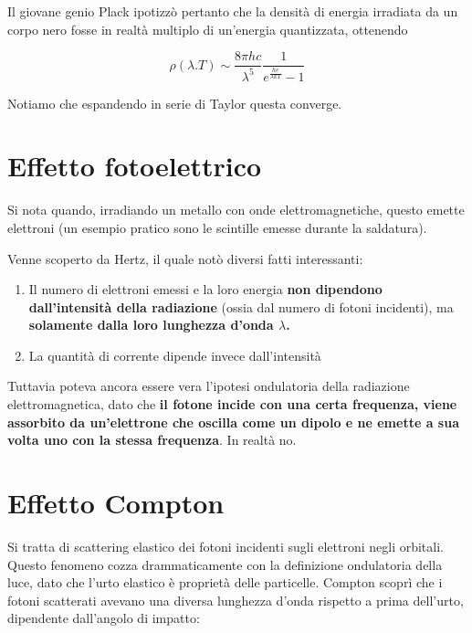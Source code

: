 Il giovane genio Plack ipotizz\`o pertanto che la densit\`a di energia irradiata da un corpo nero fosse in realt\`a multiplo di un'energia quantizzata, ottenendo

\begin{equation}
\rho(\lambda. T) \sim \frac{8\pi h c}{\lambda^5} \frac{1}{e^{\frac{hc}{\lambda k T}} -1}
\end{equation}

Notiamo che espandendo in serie di Taylor questa converge.\\




\section{Effetto fotoelettrico}

Si nota quando, irradiando un metallo con onde elettromagnetiche, questo emette elettroni (un esempio pratico sono le scintille emesse durante la saldatura).

Venne scoperto da Hertz, il quale notò diversi fatti interessanti:

\begin{enumerate}

\item Il numero di elettroni emessi e la loro energia \textbf{non dipendono dall'intensit\`a della radiazione} (ossia dal numero di fotoni incidenti), ma \textbf{solamente dalla loro lunghezza d'onda $\lambda$.}

\item La quantità di corrente dipende invece dall'intensit\`a
\end{enumerate}

Tuttavia poteva ancora essere vera l'ipotesi ondulatoria della radiazione elettromagnetica, dato che \textbf{il fotone incide con una certa frequenza, viene assorbito da un'elettrone che oscilla come un dipolo e ne emette a sua volta uno con la stessa frequenza}. In realtà no.



\section{Effetto Compton}

Si tratta di scattering elastico dei fotoni incidenti sugli elettroni negli orbitali. Questo fenomeno cozza drammaticamente con la definizione ondulatoria della luce, dato che l'urto elastico è proprietà delle particelle. \newline
Compton scoprì che i fotoni scatterati avevano una diversa lunghezza d'onda rispetto a prima dell'urto, dipendente dall'angolo di impatto:

